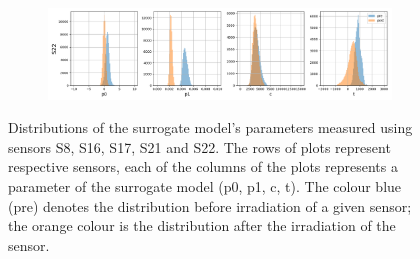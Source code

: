 \begin{figure}
\begin{subfigure}[b]{1.\textwidth}
    \centering
    \includegraphics[width=\linewidth]{figures/chapter4/surrogates/p1_S22_histos.png}
  \end{subfigure}

  \caption[Surrogate parameters distribution part 1]{Distributions of the surrogate model's parameters measured using sensors S8, S16, S17, S21 and S22. The rows of plots represent respective sensors, each of the columns of the plots represents a parameter of the surrogate model (p0, p1, c, t).  The colour blue (pre) denotes the distribution before irradiation of a given sensor; the orange colour is the distribution after the irradiation of the sensor.}
\label{plot:sensor_surrogate_p1}
\end{figure}

